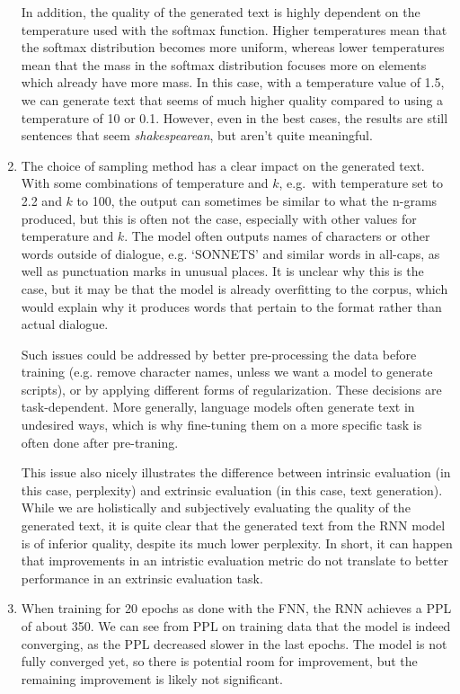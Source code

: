 \documentclass[11pt,a4paper]{article}
\begin{document}
\begin{enumerate}[label=(\alph*)]
          In addition, the quality of the generated text is highly dependent on
          the temperature used with the softmax function.
          Higher temperatures mean that the softmax distribution becomes more
          uniform, whereas lower temperatures mean that the mass in the softmax
          distribution focuses more on elements which already have more mass.
          In this case, with a temperature value of 1.5, we can generate text
          that seems of much higher quality compared to using a temperature of
          10 or 0.1.
          However, even in the best cases, the results are still sentences that
          seem \emph{shakespearean}, but aren't quite meaningful.
    \item The choice of sampling method has a clear impact on the generated
          text.
          With some combinations of temperature and $k$, e.g.\ with temperature
          set to 2.2 and $k$ to 100, the output can sometimes be similar to what
          the n-grams produced, but this is often not the case, especially with
          other values for temperature and $k$.
          The model often outputs names of characters or other words outside of
          dialogue, e.g. `SONNETS' and similar words in all-caps, as well as
          punctuation marks in unusual places.
          It is unclear why this is the case, but it may be that the model is
          already overfitting to the corpus, which would explain why it
          produces words that pertain to the format rather than actual dialogue.

          Such issues could be addressed by better pre-processing the data
          before training (e.g. remove character names, unless we want a model
          to generate scripts), or by applying different forms of
          regularization.
          These decisions are task-dependent.
          More generally, language models often generate text in undesired ways,
          which is why fine-tuning them on a more specific task is often done
          after pre-traning.

          This issue also nicely illustrates the difference between intrinsic
          evaluation (in this case, perplexity) and extrinsic evaluation (in
          this case, text generation).
          While we are holistically and subjectively evaluating the quality of
          the generated text, it is quite clear that the generated text from the
          RNN model is of inferior quality, despite its much lower perplexity.
          In short, it can happen that improvements in an intristic evaluation
          metric do not translate to better performance in an extrinsic
          evaluation task.
    \item When training for 20 epochs as done with the FNN, the RNN achieves a
          PPL of about 350.
          We can see from PPL on training data that the model is indeed
          converging, as the PPL decreased slower in the last epochs.
          The model is not fully converged yet, so there is potential room for
          improvement, but the remaining improvement is likely not significant.
\end{enumerate}
\end{document}
